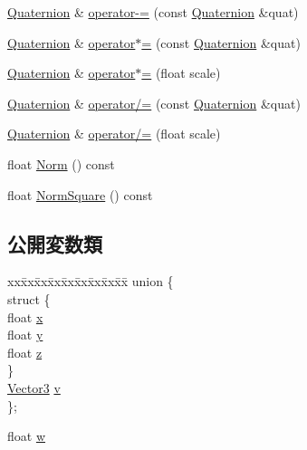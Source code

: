 \begin{DoxyCompactItemize}
\item 
\mbox{\hyperlink{struct_math_1_1_quaternion}{Quaternion}} \& \mbox{\hyperlink{struct_math_1_1_quaternion_af1884a86f9d7d61197a2fb8a704bc58f}{operator-\/=}} (const \mbox{\hyperlink{struct_math_1_1_quaternion}{Quaternion}} \&quat)
\item 
\mbox{\hyperlink{struct_math_1_1_quaternion}{Quaternion}} \& \mbox{\hyperlink{struct_math_1_1_quaternion_ab259c5d0a79c9fcb816b2167f8dc32dd}{operator$\ast$=}} (const \mbox{\hyperlink{struct_math_1_1_quaternion}{Quaternion}} \&quat)
\item 
\mbox{\hyperlink{struct_math_1_1_quaternion}{Quaternion}} \& \mbox{\hyperlink{struct_math_1_1_quaternion_a138f8b4c70cf0280ad19072c675201ab}{operator$\ast$=}} (float scale)
\item 
\mbox{\hyperlink{struct_math_1_1_quaternion}{Quaternion}} \& \mbox{\hyperlink{struct_math_1_1_quaternion_a04a144dcc8a5401104fd88248b13e84a}{operator/=}} (const \mbox{\hyperlink{struct_math_1_1_quaternion}{Quaternion}} \&quat)
\item 
\mbox{\hyperlink{struct_math_1_1_quaternion}{Quaternion}} \& \mbox{\hyperlink{struct_math_1_1_quaternion_a2157dd9798f538ebd2463cd962c11a64}{operator/=}} (float scale)
\item 
float \mbox{\hyperlink{struct_math_1_1_quaternion_a1cd5a9d8be7f9b85c4eb7ba661238a09}{Norm}} () const
\item 
float \mbox{\hyperlink{struct_math_1_1_quaternion_a8f147b15819df35d4448c9765adc4eb8}{Norm\+Square}} () const
\end{DoxyCompactItemize}
\subsection*{公開変数類}
\begin{DoxyCompactItemize}
\item 
\begin{tabbing}
xx\=xx\=xx\=xx\=xx\=xx\=xx\=xx\=xx\=\kill
union \{\\
\>struct \{\\
\>\>float \mbox{\hyperlink{struct_math_1_1_quaternion_ad482a0bc0b3759696ce73af10ae4ce62}{x}}\\
\>\>float \mbox{\hyperlink{struct_math_1_1_quaternion_affec7ef4764711e8df983d5439494050}{y}}\\
\>\>float \mbox{\hyperlink{struct_math_1_1_quaternion_af5df1935c0d63acfd4fc4e65ae0e30d2}{z}}\\
\>\} \\
\>\mbox{\hyperlink{struct_math_1_1_vector3}{Vector3}} \mbox{\hyperlink{struct_math_1_1_quaternion_a628a90b817e19edde055fc4745e25f5c}{v}}\\
\}; \\

\end{tabbing}\item 
float \mbox{\hyperlink{struct_math_1_1_quaternion_a9736171bbae3bee22f12d23f3fefb682}{w}}
\end{DoxyCompactItemize}


